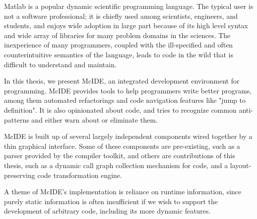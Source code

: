 {\sc Matlab}\textsuperscript{\textregistered} is a popular dynamic scientific
programming language. The typical \matlab user is not a software professional;
it is chiefly used among scientists, engineers, and students, and enjoys wide
adoption in large part because of its high level syntax and wide array of
libraries for many problem domains in the sciences. The inexperience of many
\matlab programmers, coupled with the ill-specified and often counterintuitive
semantics of the language, leads to \matlab code in the wild that is difficult
to understand and maintain.

In this thesis, we present McIDE, an integrated development environment for
\matlab programming. McIDE provides tools to help \matlab programmers write
better programs, among them automated refactorings and code navigation features
like "jump to definition". It is also opinionated about \matlab code, and tries
to recognize common anti-patterns and either warn about or eliminate them.

McIDE is built up of several largely independent components wired together by a
thin graphical interface. Some of these components are pre-existing, such as a
\matlab parser provided by the \mclab compiler toolkit, and others are
contributions of this thesis, such as a dynamic call graph collection mechanism
for \matlab code, and a layout-preserving code transformation engine.

A theme of McIDE's implementation is reliance on runtime information, since
purely static information is often insufficient if we wish to support the
development of arbitrary \matlab code, including its more dynamic features.
